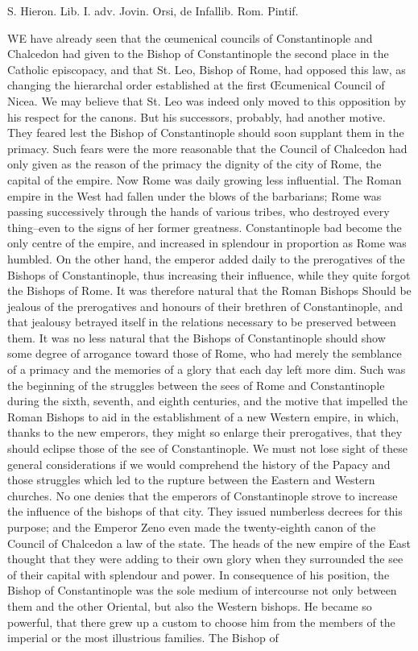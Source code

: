 S. Hieron. Lib. I. adv. Jovin. Orsi, de Infallib. Rom. Pintif.


WE have already seen that the œumenical councils of Constantinople and Chalcedon had given to the Bishop of Constantinople the second place in the Catholic episcopacy, and that St. Leo, Bishop of Rome, had opposed this law, as changing the hierarchal order established at the first Œcumenical Council of Nicea. We may believe that St. Leo was indeed only moved to this opposition by his respect for the canons. But his successors, probably, had another motive. They feared lest the Bishop of Constantinople should soon supplant them in the primacy. Such fears were the more reasonable that the Council of Chalcedon had only given as the reason of the primacy the dignity of the city of Rome, the capital of the empire. Now Rome was daily growing less influential. The Roman empire in the West had fallen under the blows of the barbarians; Rome was passing successively through the hands of various tribes, who destroyed every thing--even to the signs of her former greatness. Constantinople bad become the only centre of the empire, and increased in splendour in proportion as Rome was humbled. On the other hand, the emperor added daily to the prerogatives of the Bishops of Constantinople, thus increasing their influence, while they quite forgot the Bishops of Rome. It was therefore natural that the Roman Bishops Should be jealous of the prerogatives and honours of their brethren of Constantinople, and that jealousy betrayed itself in the relations necessary to be preserved between them. It was no less natural that the Bishops of Constantinople should show some degree of arrogance toward those of Rome, who had merely the semblance of a primacy and the memories of a glory that each day left more dim. Such was the beginning of the struggles between the sees of Rome and Constantinople during the sixth, seventh, and eighth centuries, and the motive that impelled the Roman Bishops to aid in the establishment of a new Western empire, in which, thanks to the new emperors, they might so enlarge their prerogatives, that they should eclipse those of the see of Constantinople. We must not lose sight of these general considerations if we would comprehend the history of the Papacy and those struggles which led to the rupture between the Eastern and Western churches. No one denies that the emperors of Constantinople strove to increase the influence of the bishops of that city. They issued numberless decrees for this purpose; and the Emperor Zeno even made the twenty-eighth canon of the Council of Chalcedon a law of the state. The heads of the new empire of the East thought that they were adding to their own glory when they surrounded the see of their capital with splendour and power. In consequence of his position, the Bishop of Constantinople was the sole medium of intercourse not only between them and the other Oriental, but also the Western bishops. He became so powerful, that there grew up a custom to choose him from the members of the imperial or the most illustrious families. The Bishop of 